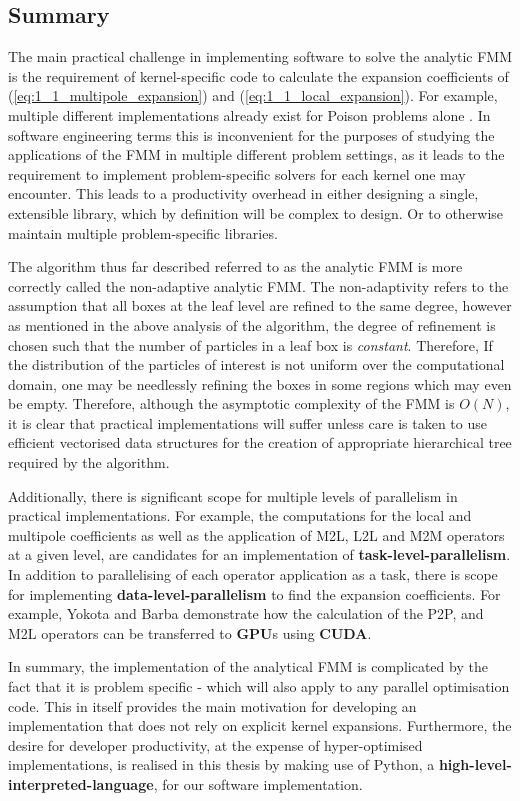 \subsection{Summary}

The main practical challenge in implementing software to solve the analytic FMM
is the requirement of kernel-specific code to calculate the expansion coefficients of
(\ref{eq:1_1_multipole_expansion}) and (\ref{eq:1_1_local_expansion}). For example,
multiple different implementations already exist for Poison problems alone \cite{Greengard:1996:JCP, Etheridge:2001:SIAM}.
In software engineering terms this is inconvenient for the purposes of studying
the applications of the FMM in multiple different problem settings, as it leads to the requirement
to implement problem-specific solvers for each kernel one may encounter. This
leads to a productivity overhead in either designing a single, extensible
library, which by definition will be complex to design. Or to otherwise
maintain multiple problem-specific libraries.

The algorithm thus far described referred to as the analytic FMM is more correctly
called the non-adaptive analytic FMM. The non-adaptivity refers to the assumption that
all boxes at the leaf level are refined to the same degree, however as mentioned
in the above analysis of the algorithm, the degree of refinement is chosen such
that the number of particles in a leaf box is \textit{constant}. Therefore, If
the distribution of the particles of interest is not uniform over the computational
domain, one may be needlessly refining the boxes in some regions which may even be
empty. Therefore, although the asymptotic complexity of
the FMM is $O(N)$, it is clear that practical implementations will suffer unless
care is taken to use efficient vectorised data structures for the creation of
appropriate hierarchical tree required by the algorithm.

Additionally, there is significant scope for multiple levels of
parallelism in practical implementations. For example, the computations
for the local and multipole coefficients as well as the application of M2L, L2L
and M2M operators at a given level, are candidates for an implementation of
\textbf{\gls{task-level-parallelism}}. In addition to parallelising of each operator
application as a task, there is scope for implementing
\textbf{\gls{data-level-parallelism}} to find the expansion coefficients. For example,
Yokota and Barba \cite{Hwu:2011:MKP} demonstrate how the calculation of the P2P,
and M2L operators can be transferred to \textbf{\gls{GPU}}s using \textbf{\gls{CUDA}}.

In summary, the implementation of the analytical FMM is complicated by the
fact that it is problem specific - which will also apply to any parallel
optimisation code. This in itself provides the main motivation for developing
an implementation that does not rely on explicit kernel expansions. Furthermore,
the desire for developer productivity, at the expense of hyper-optimised
implementations, is realised in this thesis by making use of Python,
a \textbf{\gls{high-level-interpreted-language}}, for our software implementation.
